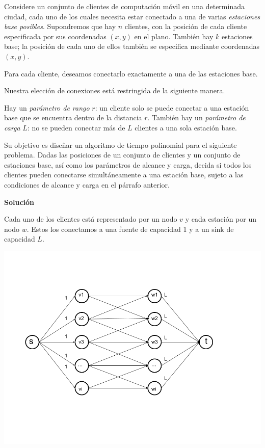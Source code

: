 \documentclass{article}
\begin{document}
Considere un conjunto de clientes de computación móvil en una determinada
ciudad, cada uno de los cuales necesita estar conectado a una de varias
\textit{estaciones base posibles}. Supondremos que hay $n$ clientes, con la
posición de cada cliente especificada por sus coordenadas $(x, y)$ en el plano.
También hay $k$ estaciones base; la posición de cada uno de ellos también se
especifica mediante coordenadas $(x, y)$.

Para cada cliente, deseamos conectarlo exactamente a una de las estaciones base.

Nuestra elección de conexiones está restringida de la siguiente manera.

Hay un \textit{parámetro de rango} $r$: un cliente solo se puede conectar a una
estación base que se encuentra dentro de la distancia $r$. También hay un
\textit{parámetro de carga} $L$: no se pueden conectar más de $L$ clientes a una
sola estación base.

Su objetivo es diseñar un algoritmo de tiempo polinomial para el siguiente
problema. Dadas las posiciones de un conjunto de clientes y un conjunto de
estaciones base, así como los parámetros de alcance y carga, decida si todos los
clientes pueden conectarse simultáneamente a una estación base, sujeto a las
condiciones de alcance y carga en el párrafo anterior.


\textbf{Solución}

Cada uno de los clientes está representado por un nodo $v$ y cada estación por
un nodo $w$. Estos los conectamos a una fuente de capacidad 1 y a un sink de
capacidad $L$.

\includegraphics[scale=0.3]{figures/bipartite_matching.png}
\end{document}
